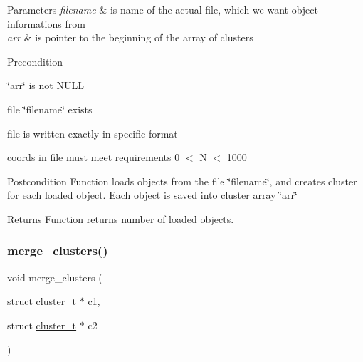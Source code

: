 \begin{DoxyParams}{Parameters}
{\em filename} & is name of the actual file, which we want object informations from\\
\hline
{\em arr} & is pointer to the beginning of the array of clusters\\
\hline
\end{DoxyParams}
\begin{DoxyPrecond}{Precondition}

\begin{DoxyItemize}
\item \char`\"{}arr\char`\"{} is not N\+U\+LL
\item file \char`\"{}filename\char`\"{} exists
\item file is written exactly in specific format
\item coords in file must meet requirements 0 $<$ N $<$ 1000
\end{DoxyItemize}
\end{DoxyPrecond}
\begin{DoxyPostcond}{Postcondition}
Function loads objects from the file \char`\"{}filename\char`\"{}, and creates cluster for each loaded object. Each object is saved into cluster array \char`\"{}arr\char`\"{}
\end{DoxyPostcond}
\begin{DoxyReturn}{Returns}
Function returns number of loaded objects. 
\end{DoxyReturn}
\mbox{\label{group___cluster_operations_gac39a25fdec1f4952ec92ee5407893158}} 
\subsubsection{\texorpdfstring{merge\+\_\+clusters()}{merge\_clusters()}}
{\footnotesize\ttfamily void merge\+\_\+clusters (\begin{DoxyParamCaption}\item[{struct \mbox{\hyperlink{structcluster__t}{cluster\+\_\+t}} $\ast$}]{c1,  }\item[{struct \mbox{\hyperlink{structcluster__t}{cluster\+\_\+t}} $\ast$}]{c2 }\end{DoxyParamCaption})}



